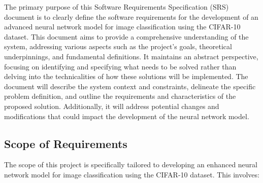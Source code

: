 \documentclass[12pt]{article}
\begin{document}
The primary purpose of this Software Requirements Specification (SRS) document is to clearly define the software 
requirements for the development of an advanced neural network model for image classification using the CIFAR-10 
dataset. This document aims to provide a comprehensive understanding of the system, addressing various aspects 
such as the project's goals, theoretical underpinnings, and fundamental definitions. It maintains an abstract 
perspective, focusing on identifying and specifying what needs to be solved rather than delving into the technicalities 
of how these solutions will be implemented. The document will describe the system context and constraints, delineate 
the specific problem definition, and outline the requirements and characteristics of the proposed solution. Additionally, 
it will address potential changes and modifications that could impact the development of the neural network model.

\subsection{Scope of Requirements} 

The scope of this project is specifically tailored to developing an enhanced neural network model for image 
classification using the CIFAR-10 dataset. This involves:
\end{document}
